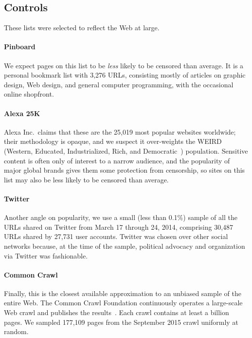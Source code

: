 \subsection{Controls}

These lists were selected to reflect the Web at large.

\paragraph{Pinboard}\label{s:lists-pinboard}
We expect pages on this list to be \emph{less} likely to be censored
than average. It is a personal bookmark list with 3,276 URLs,
consisting mostly of articles on graphic design, Web design, and
general computer programming, with the occasional online shopfront.

\paragraph{Alexa 25K}\label{s:lists-alexa}
Alexa Inc.\ claims that these are the 25,019 most popular websites
worldwide; their methodology is opaque, and we suspect it over-weights
the WEIRD (Western, Educated, Industrialized, Rich, and
Democratic~\cite{henrich2010weird}) population.  Sensitive content is
often only of interest to a narrow audience, and the popularity of
major global brands gives them some protection from censorship, so
sites on this list may also be less likely to be censored than
average.

\paragraph{Twitter}\label{s:lists-twitter}
Another angle on popularity, we use a small (less than 0.1\%) sample
of all the URLs shared on Twitter from March 17 through 24, 2014,
comprising 30,487 URLs shared by 27,731 user accounts.  Twitter was
chosen over other social networks because, at the time of the sample,
political advocacy and organization via Twitter was fashionable.

\paragraph{Common Crawl}\label{s:lists-ccrawl}
Finally, this is the closest available approximation to an unbiased
sample of the entire Web.  The Common Crawl Foundation continuously
operates a large-scale Web crawl and publishes the
results~\cite{commoncrawl}. Each crawl contains at least a billion
pages. We sampled 177,109 pages from the September 2015 crawl
uniformly at random.


